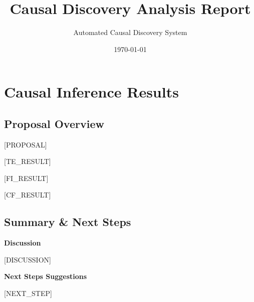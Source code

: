 \documentclass[10pt]{article}
\title{Causal Discovery Analysis Report}
\author{Automated Causal Discovery System}
\date{\today}
\begin{document}
\maketitle

\section{Causal Inference Results}
\subsection{Proposal Overview}
[PROPOSAL]

[TE_RESULT]

[FI_RESULT]

[CF_RESULT]

\subsection{Summary \& Next Steps}
\textbf{Discussion}

[DISCUSSION]


\textbf{Next Steps Suggestions}

[NEXT_STEP]
\end{document}
